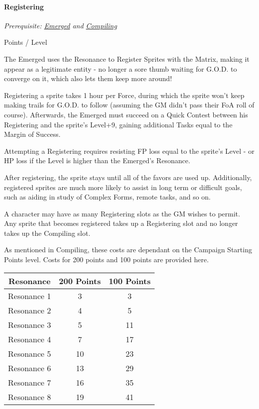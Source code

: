 \begin{multicols*}{3}
	\paragraph{Registering}\label{registering}
	\textit{Prerequisite: \hyperref[emerged]{Emerged} and \hyperref[compiling]{Compiling}}
	\begin{flushright}
		 Points / Level
	\end{flushright}
	
	The Emerged uses the Resonance to Register Sprites with the Matrix, making it appear as a legitimate entity - no longer a sore thumb waiting for G.O.D. to converge on it, which also lets them keep more around!
	
	Registering a sprite takes 1 hour per Force, during which the sprite won't keep making trails for G.O.D. to follow (assuming the GM didn't pass their FoA roll of course). Afterwards, the Emerged must succeed on a Quick Contest between his Registering and the sprite's Level+9, gaining additional Tasks equal to the Margin of Success.
	
	Attempting a Registering requires resisting FP loss equal to the sprite's Level - or HP loss if the Level is higher than the Emerged's Resonance. 
	
	After registering, the sprite stays until all of the favors are used up. Additionally, registered sprites are much more likely to assist in long term or difficult goals, such as aiding in study of Complex Forms, remote tasks, and so on.
	
	A character may have as many Registering slots as the GM wishes to permit. Any sprite that becomes registered takes up a Registering slot and no longer takes up the Compiling slot.
	
	As mentioned in Compiling, these costs are dependant on the Campaign Starting Points level. Costs for 200 points and 100 points are provided here.		
		
	\begin{center}
		\begin{tabular}{|c|c|c|}
			\hline
			Resonance & 200 Points & 100 Points \\
			\hline
			\hline
			Resonance 1 & 3 & 3 \\
			Resonance 2 & 4 & 5 \\
			Resonance 3 & 5 & 11 \\
			Resonance 4 & 7 & 17 \\
			Resonance 5 & 10 & 23 \\
			Resonance 6 & 13 & 29 \\
			Resonance 7 & 16 & 35 \\
			Resonance 8 & 19 & 41 \\
			\hline
		\end{tabular}
	\end{center}	
	

\end{multicols*}
